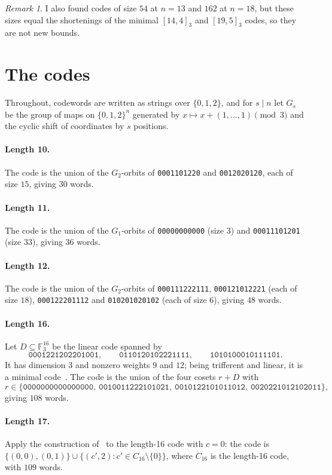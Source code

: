 \documentclass[11pt]{article}
\theoremstyle{remark}
\newtheorem{remark}[theorem]{Remark}
\newcommand{\F}{\mathbb{F}}
\newcommand{\w}[1]{\texttt{#1}}
\begin{document}
\begin{remark}
I also found codes of size $54$ at $n=13$ and $162$ at $n=18$, but these sizes equal the shortenings of the minimal $[14,4]_3$ and $[19,5]_3$ codes, so they are not new bounds.
\end{remark}

\section{The codes}

Throughout, codewords are written as strings over $\{0,1,2\}$, and for $s\mid n$ let $G_s$ be the group of maps on $\{0,1,2\}^n$ generated by $x\mapsto x+(1,\dots,1)\pmod 3$ and the cyclic shift of coordinates by $s$ positions.

\paragraph{Length 10.} The code is the union of the $G_2$-orbits of
\w{0001101220} and \w{0012020120}, each of size $15$, giving $30$ words.

\paragraph{Length 11.} The code is the union of the $G_1$-orbits of
\w{00000000000} (size $3$) and \w{00011101201} (size $33$), giving $36$ words.

\paragraph{Length 12.} The code is the union of the $G_2$-orbits of
\w{000111222111}, \w{000121012221} (each of size $18$), \w{000122201112} and \w{010201020102} (each of size $6$), giving $48$ words.

\paragraph{Length 16.} Let $D\subseteq\F_3^{16}$ be the linear code spanned by
\[
\w{0001221202201001},\qquad \w{0110120102221111},\qquad \w{1010100010111101}.
\]
It has dimension $3$ and nonzero weights $9$ and $12$; being trifferent and linear, it is a minimal code~\cite{bishnoi2023}.
The code is the union of the four cosets $r+D$ with
\[
r\in\{\w{0000000000000000},\ \w{0010011222101021},\ \w{0010122101011012},\ \w{0020221012102011}\},
\]
giving $108$ words.

\paragraph{Length 17.} Apply the construction of~\cite[Lemma~1]{kurz2024} to the length-16 code with $c=0$: the code is $\{(0,0),(0,1)\}\cup\{(c',2): c'\in C_{16}\setminus\{0\}\}$, where $C_{16}$ is the length-16 code, with $109$ words.
\end{document}
